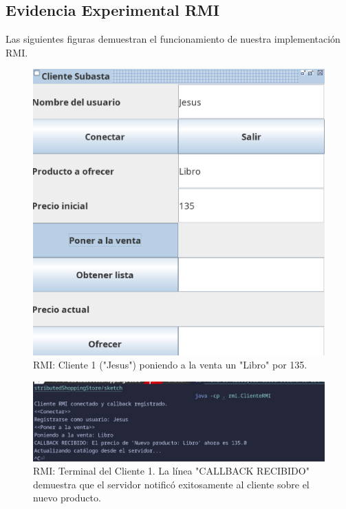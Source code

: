 \documentclass[11pt, a4paper]{article}
\begin{document}
\subsection{Evidencia Experimental RMI}
Las siguientes figuras demuestran el funcionamiento de nuestra implementación RMI.
\begin{figure}[h!]
    \centering
    \includegraphics[width=0.7\linewidth]{media/rmi-screenshots/Sell-Item-Client1.png}
    \caption{RMI: Cliente 1 ("Jesus") poniendo a la venta un "Libro" por 135.}
    \label{fig:rmi_vender_gui}
\end{figure}

\begin{figure}[h!]
    \centering
    \includegraphics[width=0.9\linewidth]{media/rmi-screenshots/Sell-Item-Terminal-Client-1.png}
    \caption{RMI: Terminal del Cliente 1. La línea "CALLBACK RECIBIDO" demuestra que el servidor notificó exitosamente al cliente sobre el nuevo producto.}
    \label{fig:rmi_vender_term}
\end{figure}
\end{document}
